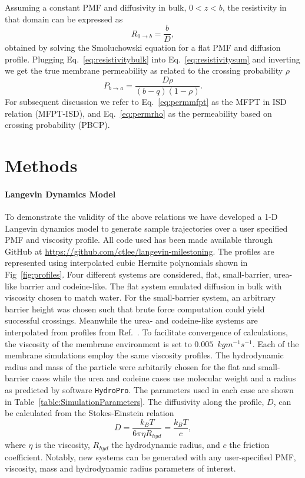         Assuming a constant PMF and diffusivity in bulk, $0<z<b$, the resistivity in that domain can be expressed as
        \begin{equation}
            R_{0\rightarrow b} = \frac{b}{D},
            \label{eq:resistivitybulk}
        \end{equation}
        obtained by solving the Smoluchowski equation for a flat PMF and diffusion profile. Plugging Eq.~\ref{eq:resistivitybulk} into Eq.~\ref{eq:resistivitysum} and inverting we get the true membrane permeability as related to the crossing probability $\rho$
        \begin{equation}
            P_{b\rightarrow a} = \frac{D\rho}{(b-q)(1-\rho)}.
            \label{eq:permrho}
        \end{equation}
        For subsequent discussion we refer to Eq.~\ref{eq:permmfpt} as the MFPT in ISD relation (MFPT-ISD), and Eq.~\ref{eq:permrho} as the permeability based on crossing probability (PBCP).
\clearpage{}

    \clearpage{}\section*{Methods}
    \paragraph{Langevin Dynamics Model} To demonstrate the validity of the above relations we have developed a 1-D Langevin dynamics model to generate sample trajectories over a user specified PMF and viscosity profile. All code used has been made available through GitHub at \url{https://github.com/ctlee/langevin-milestoning}. The profiles are represented using interpolated cubic Hermite polynomials shown in Fig~\ref{fig:profiles}. Four different systems are considered, flat, small-barrier, urea-like barrier and codeine-like. The flat system emulated diffusion in bulk with viscosity chosen to match water. For the small-barrier system, an arbitrary barrier height was chosen such that brute force computation could yield successful crossings. Meanwhile the urea- and codeine-like systems are interpolated from profiles from Ref.~. To facilitate convergence of calculations, the viscosity of the membrane environment is set to $0.005$~$kg m^{-1}s^{-1}$. Each of the membrane simulations employ the same viscosity profiles. The hydrodynamic radius and mass of the particle were arbitarily chosen for the flat and small-barrier cases while the urea and codeine cases use molecular weight and a radius as predicted by software \texttt{HydroPro}\cite{Ortega2011}. The parameters used in each case are shown in Table~\ref{table:SimulationParameters}. The diffusivity along the profile, $D$, can be calculated from the Stokes-Einstein relation
    \begin{equation}
        D = \frac{k_BT}{6\pi\eta R_{hyd}} = \frac{k_BT}{c},
        \label{eq:stokes-einstein}
    \end{equation}
    where $\eta$ is the viscosity, $R_{hyd}$ the hydrodynamic radius, and $c$ the friction coefficient. Notably, new systems can be generated with any user-specified PMF, viscosity, mass and hydrodynamic radius parameters of interest.

